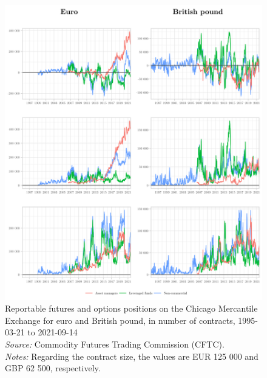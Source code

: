 \documentclass[a4paper, twoside]{templates/ociamthesis}
\begin{document}
\begin{figure}[!ht]

{\centering \includegraphics[width=0.99\columnwidth]{figure/GTOG_EURGBP} 

}

\caption[Reportable futures and options positions on the Chicago Mercantile Exchange for euro and British pound, in number of contracts, 1995-03-21 to 2021-09-14]{Reportable futures and options positions on the Chicago Mercantile Exchange for euro and British pound, in number of contracts, 1995-03-21 to 2021-09-14 \\ \scriptsize \textit{Source:} Commodity Futures Trading Commission (CFTC). \\ \scriptsize \textit{Notes:} Regarding the contract size, the values are EUR 125 000 and GBP 62 500, respectively.}\label{fig:FigureA32}
\end{figure}

\clearpage
\end{document}
